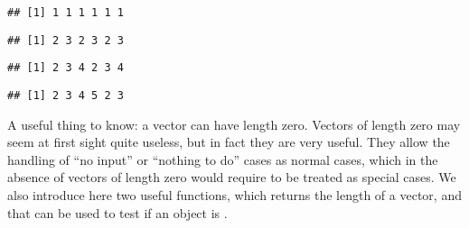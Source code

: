 \documentclass[paper=a4,10pt,div=17,headsepline,BCOR=12mm,twoside,open=right]{scrbook}\usepackage{knitr}
\begin{document}
\begin{knitrout}\footnotesize
{}\color{fgcolor}\begin{kframe}
\begin{alltt}
 \hlkwb{<-} \hlstd{(}\hlstd{,} \hlstd{)}
\end{alltt}
\begin{verbatim}
## [1] 1 1 1 1 1 1
\end{verbatim}
\begin{alltt}
 \hlopt{+} \hlopt{:}
\end{alltt}
\begin{verbatim}
## [1] 2 3 2 3 2 3
\end{verbatim}
\begin{alltt}
 \hlopt{+} \hlopt{:}
\end{alltt}
\begin{verbatim}
## [1] 2 3 4 2 3 4
\end{verbatim}
\begin{alltt}
 \hlopt{+} \hlopt{:}
\end{alltt}


{\ttfamily\noindent\color{warningcolor}{\#\# Warning in a + 1:4: longer object length is not a multiple of shorter object length}}\begin{verbatim}
## [1] 2 3 4 5 2 3
\end{verbatim}
\end{kframe}
\end{knitrout}

A useful thing to know: a vector can have length zero. Vectors of length zero may seem at first sight quite useless, but in fact they are very useful. They allow the handling of ``no input'' or ``nothing to do'' cases as normal cases, which in the absence of vectors of length zero would require to be treated as special cases. We also introduce here two useful functions,  which returns the length of a vector, and  that can be used to test if an \R object is . 
\end{document}
